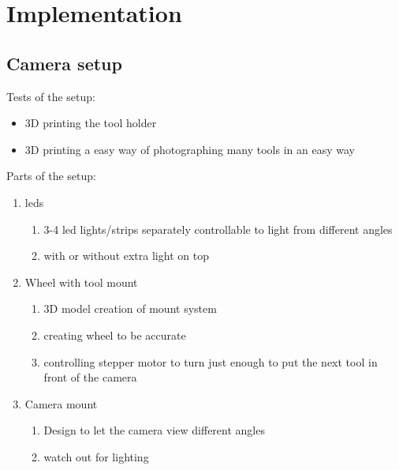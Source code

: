  
\chapter{Implementation}


\section{Camera setup}
Tests of the setup: 

\begin{itemize}
\item 3D printing the tool holder
\item 3D printing a easy way of photographing many tools in an easy way
\end{itemize}




Parts of the setup:

\begin{enumerate}
\item leds
	\begin{enumerate}
	\item 3-4 led lights/strips separately controllable to light from different angles
	\item with or without extra light on top
	\end{enumerate}
\item Wheel with tool mount
	\begin{enumerate}
	\item 3D model creation of mount system
	\item creating wheel to be accurate
	\item controlling stepper motor to turn just enough to put the next tool in front of the camera
	\end{enumerate}
\item Camera mount
	\begin{enumerate}
	\item Design to let the camera view different angles
	\item watch out for lighting
	\end{enumerate}
\end{enumerate}

